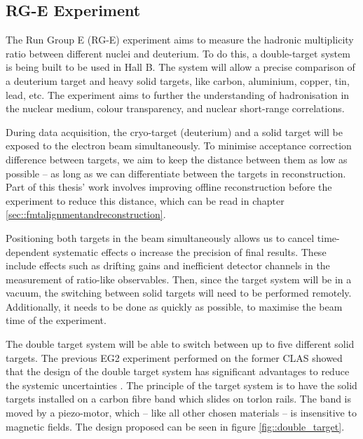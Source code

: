 \subsection{RG-E Experiment} \label{ssec::rgeexperiment}
    The Run Group E (RG-E) experiment aims to measure the hadronic multiplicity ratio between different nuclei and deuterium.
    To do this, a double-target system is being built to be used in Hall B.
    The system will allow a precise comparison of a deuterium target and heavy solid targets, like carbon, aluminium, copper, tin, lead, etc.
    The experiment aims to further the understanding of hadronisation in the nuclear medium, colour transparency, and nuclear short-range correlations.

    During data acquisition, the cryo-target (deuterium) and a solid target will be exposed to the electron beam simultaneously.
    To minimise acceptance correction difference between targets, we aim to keep the distance between them as low as possible -- as long as we can differentiate between the targets in reconstruction.
    Part of this thesis' work involves improving offline reconstruction before the experiment to reduce this distance, which can be read in chapter \ref{sec::fmtalignmentandreconstruction}.
    
    Positioning both targets in the beam simultaneously allows us to cancel time-dependent systematic effects o increase the precision of final results.
    These include effects such as drifting gains and inefficient detector channels in the measurement of ratio-like observables.
    Then, since the target system will be in a vacuum, the switching between solid targets will need to be performed remotely.
    Additionally, it needs to be done as quickly as possible, to maximise the beam time of the experiment.

    The double target system will be able to switch between up to five different solid targets.
    The previous EG2 experiment performed on the former CLAS showed that the design of the double target system has significant advantages to reduce the systemic uncertainties \cite{hakobyan2008}.
    The principle of the target system is to have the solid targets installed on a carbon fibre band which slides on torlon rails.
    The band is moved by a piezo-motor, which -- like all other chosen materials -- is insensitive to magnetic fields.
    The design proposed can be seen in figure \ref{fig::double_target}.
    
